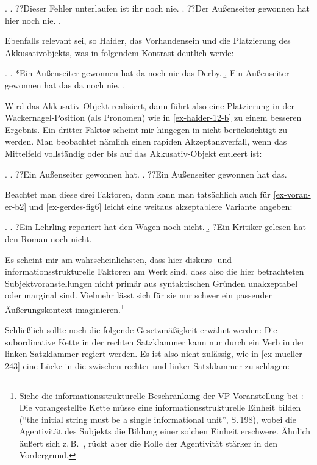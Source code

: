 \ex. 
\a. ??Dieser Fehler unterlaufen ist ihr noch nie.
\b. ??Der Au\ss enseiter gewonnen hat hier noch nie.
\z. \citep[(10)]{Haider:90}

Ebenfalls relevant sei, so Haider, das Vorhandensein und die Platzierung des Akkusativobjekts, was in folgendem Kontrast deutlich werde: 

\ex. \label{ex-haider-12} 
\a. *Ein Au\ss enseiter gewonnen hat da noch nie das Derby.\label{ex-haider-12-a}
\b. Ein Au\ss enseiter gewonnen hat das da noch nie.\label{ex-haider-12-b}
\z. \citep[(12b), (12c)]{Haider:90}

Wird das Akkusativ-Objekt realisiert, dann führt also eine Platzierung in der Wackernagel-Position (als Pronomen) wie in \ref{ex-haider-12-b} zu einem besseren Ergebnis. Ein dritter Faktor scheint mir hingegen in \cite{Haider:90} nicht berücksichtigt zu werden. Man beobachtet nämlich einen rapiden Akzeptanzverfall, wenn das Mittelfeld vollständig oder bis auf das Akkusativ-Objekt entleert ist:%

\ex. 
\a. ??Ein Au\ss enseiter gewonnen hat.
\b. ??Ein Au\ss enseiter gewonnen hat das.

Beachtet man diese drei Faktoren, dann kann man tatsächlich auch für \ref{ex-voran-er-b2} und \ref{ex-gerdes-fig6} leicht eine weitaus akzeptablere Variante angeben:

\ex.
\a. ?Ein Lehrling repariert hat den Wagen noch nicht.  
\b. ?Ein Kritiker gelesen hat den Roman noch nicht.

Es scheint mir am wahrscheinlichsten, dass hier diskurs- und informationsstrukturelle Faktoren am Werk sind, dass also die hier betrachteten Subjektvoranstellungen nicht primär aus syntaktischen Gründen unakzeptabel oder marginal sind. Vielmehr lässt sich für sie nur schwer ein passender Äu\ss erungskontext imaginieren.\footnote{Siehe die informationsstrukturelle Beschränkung der VP-Voranstellung bei \citet[Kapitel~4, Abschnitt~5.2.1]{Cook:01}: Die vorangestellte Kette müsse eine informationsstrukturelle Einheit bilden ("`the initial string must be a single informational unit"', S.\,198), wobei die Agentivität des Subjekts die Bildung einer solchen Einheit erschwere. Ähnlich äußert sich z.\,B.\ \citet[Abschnitt~5]{Gerdes:04}, rückt aber die Rolle der Agentivität stärker in den Vordergrund.} 

Schlie\ss lich sollte noch die folgende Gesetzmä\ss igkeit erwähnt werden: Die subordinative Kette in der rechten Satzklammer kann nur durch ein Verb in der linken Satzklammer regiert werden. Es ist also nicht zulässig, wie in \ref{ex-mueller-243} eine Lücke in die  zwischen rechter und linker Satzklammer zu schlagen: 

